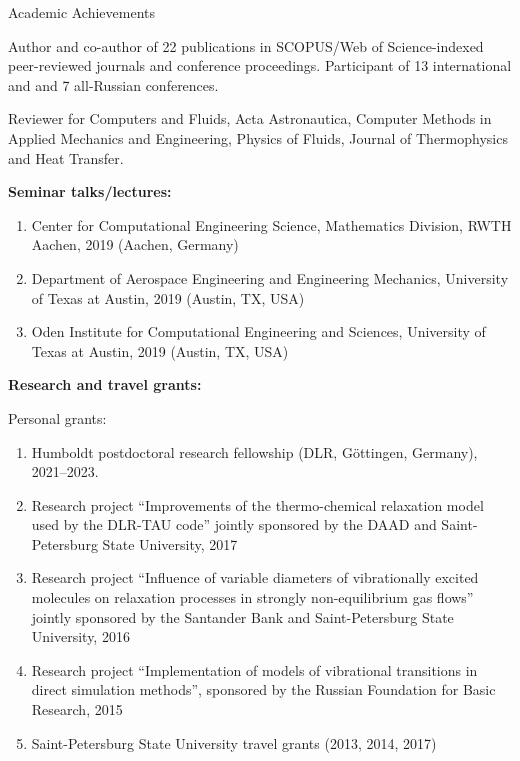 \documentclass{resume} %
\begin{document}
\begin{rSection}{Academic Achievements}

Author and co-author of 22 publications in SCOPUS/Web of Science-indexed peer-reviewed journals and conference proceedings.
Participant of 13 international and and 7 all-Russian conferences.

Reviewer for Computers and Fluids, Acta Astronautica, Computer Methods in Applied Mechanics and Engineering, Physics of Fluids, Journal of Thermophysics and Heat Transfer.

{\bf Seminar talks/lectures:}
\begin{enumerate}
    \item Center for Computational Engineering Science, Mathematics Division, RWTH Aachen, 2019 (Aachen, Germany)
    \item Department of Aerospace Engineering and Engineering Mechanics, University of Texas at Austin, 2019 (Austin, TX, USA)
    \item Oden Institute for Computational Engineering and Sciences, University of Texas at Austin, 2019 (Austin, TX, USA)
\end{enumerate}


{\bf Research and travel grants:}


Personal grants:
\begin{enumerate}

    \item Humboldt postdoctoral research fellowship (DLR,  G\"{o}ttingen, Germany), 2021--2023.
    \item Research project ``Improvements of the thermo-chemical relaxation model used by the DLR-TAU code'' jointly sponsored by the DAAD and Saint-Petersburg State University, 2017
    \item Research project ``Influence of variable diameters of vibrationally excited molecules on relaxation processes in strongly non-equilibrium gas flows'' jointly sponsored by the Santander Bank and Saint-Petersburg State University, 2016
    \item Research project ``Implementation of models of vibrational transitions in direct simulation methods'', sponsored by the Russian Foundation for Basic Research, 2015
    \item Saint-Petersburg State University travel grants (2013, 2014, 2017)


\end{enumerate}
\end{rSection}
\end{document}
